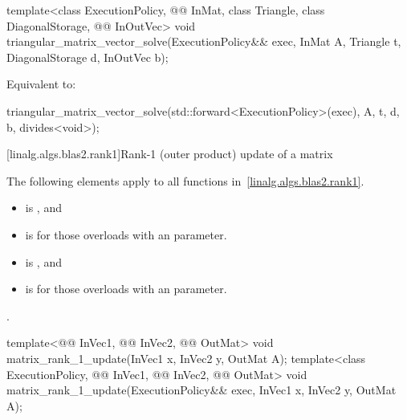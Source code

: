 %
\begin{itemdecl}
template<class ExecutionPolicy,
         @@ InMat, class Triangle, class DiagonalStorage, @@ InOutVec>
  void triangular_matrix_vector_solve(ExecutionPolicy&& exec,
                                      InMat A, Triangle t, DiagonalStorage d, InOutVec b);
\end{itemdecl}

\begin{itemdescr}
\pnum
\effects
Equivalent to:
\begin{codeblock}
triangular_matrix_vector_solve(std::forward<ExecutionPolicy>(exec),
                               A, t, d, b, divides<void>{});
\end{codeblock}
\end{itemdescr}

[linalg.algs.blas2.rank1]{Rank-1 (outer product) update of a matrix}

\pnum
The following elements apply to all functions in~\ref{linalg.algs.blas2.rank1}.

\pnum
\mandates
\begin{itemize}
\item
{}
is , and
\item
{}
is  for those overloads with an  parameter.
\end{itemize}

\pnum
\expects
\begin{itemize}
\item
{}
is , and
\item
{}
is  for those overloads with an  parameter.
\end{itemize}

\pnum
\complexity
{}.

%
\begin{itemdecl}
template<@@ InVec1, @@ InVec2, @@ OutMat>
  void matrix_rank_1_update(InVec1 x, InVec2 y, OutMat A);
template<class ExecutionPolicy, @@ InVec1, @@ InVec2, @@ OutMat>
  void matrix_rank_1_update(ExecutionPolicy&& exec, InVec1 x, InVec2 y, OutMat A);
\end{itemdecl}

